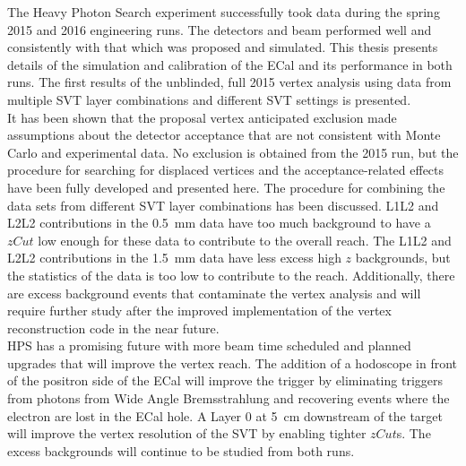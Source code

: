 The Heavy Photon Search experiment successfully took data during the spring 2015 and 2016 engineering runs. The detectors and beam performed well and consistently with that which was proposed and simulated. This thesis presents details of the simulation and calibration of the ECal and its performance in both runs. The first results of the unblinded, full 2015 vertex analysis using data from multiple SVT layer combinations and different SVT settings is presented. \\
\indent It has been shown that the proposal vertex anticipated exclusion made assumptions about the detector acceptance that are not consistent with Monte Carlo and experimental data. No exclusion is obtained from the 2015 run, but the procedure for searching for displaced vertices and the acceptance-related effects have been fully developed and presented here. The procedure for combining the data sets from different SVT layer combinations has been discussed. L1L2 and L2L2 contributions in the 0.5~mm data have too much background to have a $zCut$ low enough for these data to contribute to the overall reach. The L1L2 and L2L2 contributions in the 1.5~mm data have less excess high $z$ backgrounds, but the statistics of the data is too low to contribute to the reach. Additionally, there are excess background events that contaminate the vertex analysis and will require further study after the improved implementation of the vertex reconstruction code in the near future. \\
\indent HPS has a promising future with more beam time scheduled and planned upgrades that will improve the vertex reach. The addition of a hodoscope in front of the positron side of the ECal will improve the trigger by eliminating triggers from photons from Wide Angle Bremsstrahlung and recovering events where the electron are lost in the ECal hole. A Layer 0 at 5~cm downstream of the target will improve the vertex resolution of the SVT by enabling tighter $zCut$s. The excess backgrounds will continue to be studied from both runs. 